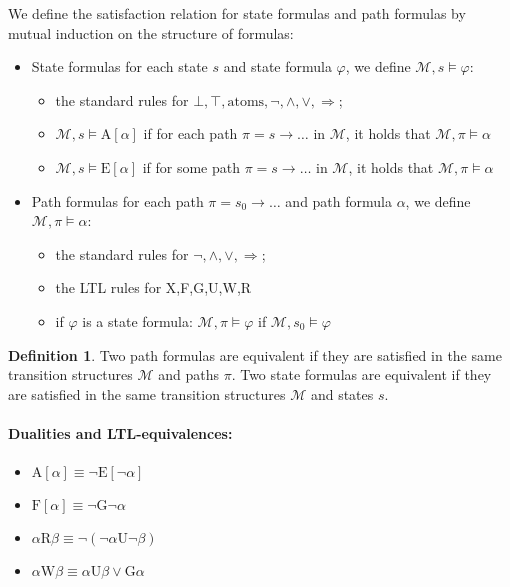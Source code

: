 \documentclass[10pt,a4paper]{article}
\theoremstyle{definition}
\newtheorem{definition}{Definition}[section]
\begin{document}
We define the satisfaction relation for state formulas and path formulas by mutual induction on the structure of formulas:

\begin{itemize}
	\item State formulas for each state $s$ and state formula $\varphi$, we define $\mathcal{M}, s \models \varphi$:
	\begin{itemize}
		\item the standard rules for $\bot, \top, \text{atoms}, \lnot, \land, \lor, \Rightarrow$;
		\item $\mathcal{M}, s \models \text{A}[\alpha]$ if for each path $\pi = s \rightarrow \dots$ in $\mathcal{M}$, it holds that $\mathcal{M}, \pi \models \alpha$
		\item $\mathcal{M}, s \models \text{E}[\alpha]$ if for some path $\pi = s \rightarrow \dots$ in $\mathcal{M}$, it holds that $\mathcal{M}, \pi \models \alpha$
	\end{itemize}
	
	\item Path formulas for each path $\pi = s_0 \rightarrow \dots$ and path formula $\alpha$, we define $\mathcal{M}, \pi \models \alpha$:
	\begin{itemize}
		\item the standard rules for $\lnot, \land, \lor, \Rightarrow$;
		\item the LTL rules for X,F,G,U,W,R
		\item if $\varphi$ is a state formula: $\mathcal{M}, \pi \models \varphi$ if $\mathcal{M}, s_0 \models \varphi$
	\end{itemize}
\end{itemize}

\begin{definition}
Two path formulas are equivalent if they are satisfied in the same transition structures $\mathcal{M}$ and paths $\pi$. Two state formulas are equivalent if they are satisfied in the same transition structures $\mathcal{M}$ and states $s$.
\end{definition}

\paragraph{Dualities and LTL-equivalences:}

\begin{itemize}
	\item $\text{A}[\alpha] \equiv \lnot \text{E}[\lnot\alpha]$
	\item $\text{F}[\alpha] \equiv \lnot \text{G}\lnot\alpha$
	\item $\alpha\text{R}\beta \equiv \lnot (\lnot\alpha\text{U}\lnot\beta)$
	\item $\alpha\text{W}\beta \equiv \alpha\text{U}\beta \lor \text{G} \alpha$
\end{itemize}
\end{document}
